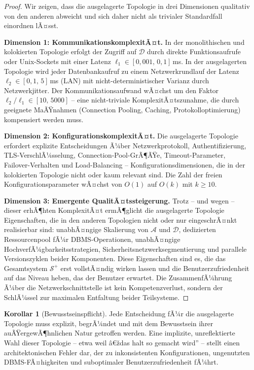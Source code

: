 ﻿\documentclass[a4paper,12pt]{article}
\theoremstyle{definition}
\newtheorem{korollar}{Korollar}
\begin{document}
\begin{proof}
Wir zeigen, dass die ausgelagerte Topologie in drei Dimensionen qualitativ von den anderen abweicht und sich daher nicht als trivialer Standardfall einordnen lÃ¤sst.

\textbf{Dimension 1: KommunikationskomplexitÃ¤t.}
In der monolithischen und kolokierten Topologie erfolgt der Zugriff auf $\mathcal{D}$ durch direkte Funktionsaufrufe oder Unix-Sockets mit einer Latenz $\ell_1 \in [0{,}001,\, 0{,}1]$\,ms. In der ausgelagerten Topologie wird jeder Datenbankaufruf zu einem Netzwerkrundlauf der Latenz $\ell_2 \in [0{,}1,\, 5]$\,ms (LAN) mit nicht-deterministischer Varianz durch Netzwerkjitter. Der Kommunikationsaufwand wÃ¤chst um den Faktor $\ell_2 / \ell_1 \in [10,\, 5000]$ -- eine nicht-triviale KomplexitÃ¤tszunahme, die durch geeignete MaÃŸnahmen (Connection Pooling, Caching, Protokolloptimierung) kompensiert werden muss.

\textbf{Dimension 2: KonfigurationskomplexitÃ¤t.}
Die ausgelagerte Topologie erfordert explizite Entscheidungen Ã¼ber Netzwerkprotokoll, Authentifizierung, TLS-VerschlÃ¼sselung, Connection-Pool-GrÃ¶ÃŸe, Timeout-Parameter, Failover-Verhalten und Load-Balancing -- Konfigurationsdimensionen, die in der kolokierten Topologie nicht oder kaum relevant sind. Die Zahl der freien Konfigurationsparameter wÃ¤chst von $O(1)$ auf $O(k)$ mit $k \geq 10$.

\textbf{Dimension 3: Emergente QualitÃ¤tssteigerung.}
Trotz -- und wegen -- dieser erhÃ¶hten KomplexitÃ¤t ermÃ¶glicht die ausgelagerte Topologie Eigenschaften, die in den anderen Topologien nicht oder nur eingeschrÃ¤nkt realisierbar sind: unabhÃ¤ngige Skalierung von $\mathcal{A}$ und $\mathcal{D}$, dedizierten Ressourcenpool fÃ¼r DBMS-Operationen, unabhÃ¤ngige HochverfÃ¼gbarkeitsstrategien, Sicherheitsnetzwerksegmentierung und parallele Versionszyklen beider Komponenten. Diese Eigenschaften sind es, die das Gesamtsystem $\mathcal{S}^+$ erst vollstÃ¤ndig wirken lassen und die Benutzerzufriedenheit auf das Niveau heben, das der Benutzer erwartet. Die ZusammenfÃ¼hrung Ã¼ber die Netzwerkschnittstelle ist kein Kompetenzverlust, sondern der SchlÃ¼ssel zur maximalen Entfaltung beider Teilsysteme.
\end{proof}

\begin{korollar}[Bewusstseinspflicht]
\label{kor:bewusstsein}
Jede Entscheidung fÃ¼r die ausgelagerte Topologie muss explizit, begrÃ¼ndet und mit dem Bewusstsein ihrer auÃŸergewÃ¶hnlichen Natur getroffen werden. Eine implizite, unreflektierte Wahl dieser Topologie -- etwa weil â€ždas halt so gemacht wird'' -- stellt einen architektonischen Fehler dar, der zu inkonsistenten Konfigurationen, ungenutzten DBMS-FÃ¤higkeiten und suboptimaler Benutzerzufriedenheit fÃ¼hrt.
\end{korollar}
\end{document}
